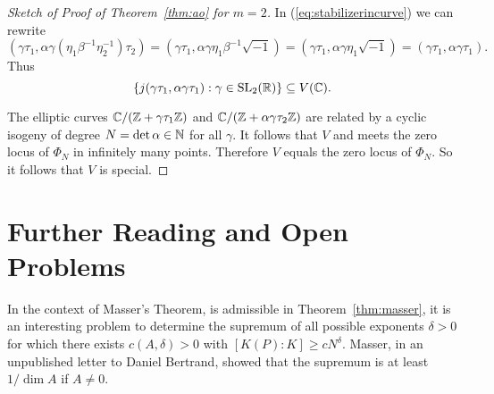 \begin{proof}[Sketch of Proof of Theorem~\ref{thm:ao} for $m=2$]
  
  In (\ref{eq:stabilizerincurve})  we can rewrite
  \begin{equation*}
    (\gamma \tau_1, \alpha \gamma(\eta_1
    \beta^{-1}\eta_2^{-1})\tau_2) =
    (\gamma\tau_1,\alpha\gamma \eta_1\beta^{-1}\sqrt{-1})
    =
        (\gamma\tau_1,\alpha\gamma \eta_1\sqrt{-1})=
    (\gamma\tau_1, \alpha \gamma\tau_1).
  \end{equation*}
  Thus
  $$    \{j(\gamma\tau_1,\alpha\gamma\tau_1) : \gamma \in \mathrm{SL}_2({\mathbb{R}})\}
  \subseteq V({\mathbb{C}}). $$
  
  The elliptic curves ${\mathbb{C}}/({\mathbb{Z}}+\gamma\tau_1{\mathbb{Z}})$ and
  ${\mathbb{C}}/({\mathbb{Z}}+\alpha\gamma\tau_2{\mathbb{Z}})$ are related by a cyclic isogeny of degree
  $N=\det\alpha\in{\mathbb{N}}$ for all $\gamma$. It follows that $V$ and meets
  the zero locus of $\Phi_N$ in infinitely many points. Therefore $V$
  equals the zero locus of $\Phi_N$.   So it follows that $V$ is special.
\end{proof}
\section{Further Reading and Open Problems}

In the context of Masser's Theorem, is admissible in
Theorem~\ref{thm:masser}, it is an interesting problem to determine
the supremum of all possible exponents $\delta>0$ for which there
exists $c(A,\delta)>0$ with $[K(P):K]\ge c N^{\delta}$. Masser, in an
unpublished letter to Daniel Bertrand, showed that the supremum is at
least $1/\dim A$ if $A\not=0$. 


